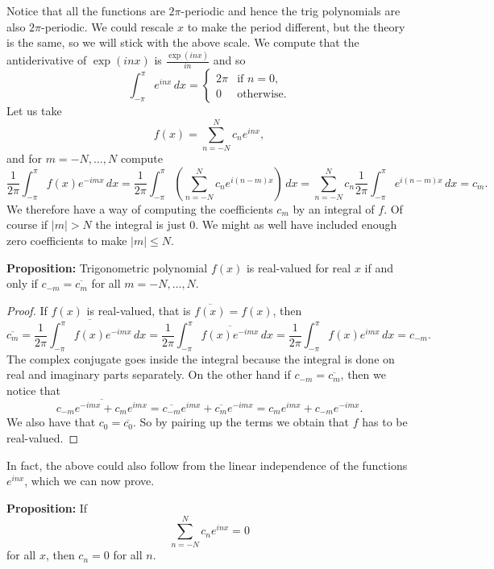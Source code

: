 \documentclass[12pt]{book}
\newcommand{\abs}[1]{\left\lvert {#1} \right\rvert}
\theoremstyle{plain}
\theoremstyle{remark}
\theoremstyle{definition}
\theoremstyle{exercise}
\theoremstyle{example}
\begin{document}
Notice that all the functions are $2\pi$-periodic and hence the trig
polynomials are also $2\pi$-periodic.
We could rescale $x$ to make the period different, but the theory is the
same, so we will stick with the above scale.
We compute that the antiderivative of $\exp(inx)$ is $\frac{\exp(inx)}{in}$ and
so
$$
\int_{-\pi}^\pi e^{inx}\,dx =
\begin{cases}
2\pi & \text{if $n=0$,} \\
0 & \text{otherwise.}
\end{cases}
$$
Let us take
$$
f(x) = \sum_{n=-N}^N c_n e^{inx} ,
$$
and for $m=-N,\ldots,N$ compute
$$
\frac{1}{2\pi} \int_{-\pi}^\pi
f(x) e^{-imx} \, dx
=
\frac{1}{2\pi} \int_{-\pi}^\pi
\left(\sum_{n=-N}^N c_n e^{i(n-m)x}\right)\,dx
=
\sum_{n=-N}^N
c_n
\frac{1}{2\pi}
\int_{-\pi}^\pi
e^{i(n-m)x}
\,dx
=
c_m .
$$
We therefore have a way of computing the coefficients $c_m$ by an integral
of $f$.  Of course if $\abs{m} > N$ the integral is just 0.  We might as
well have included enough zero coefficients to make $\abs{m} \leq N$.

\medskip

\textbf{Proposition:}
Trigonometric polynomial $f(x)$ is real-valued for real $x$ if
and only if $c_{-m} = \overline{c_m}$ for all $m=-N,\ldots,N$.

\medskip

\begin{proof}
If $f(x)$ is real-valued, that is $\overline{f(x)} = f(x)$, then
$$
\overline{c_m}
=
\overline{
\frac{1}{2\pi} \int_{-\pi}^\pi
f(x) e^{-imx} \, dx
}
=
\frac{1}{2\pi} \int_{-\pi}^\pi
\overline{
f(x) e^{-imx} } \, dx
=
\frac{1}{2\pi} \int_{-\pi}^\pi
f(x) e^{imx} \, dx
= c_{-m} .
$$
The complex conjugate goes inside the integral because the integral is
done on real and imaginary parts separately.  On the other hand if 
$c_{-m} = \overline{c_m}$, then we notice that
$$
\overline{c_{-m} e^{-imx}+ c_{m} e^{imx}}
=
\overline{c_{-m}} e^{imx}+ \overline{c_{m}} e^{-imx}
=
c_{m} e^{imx}+ c_{-m} e^{-imx} .
$$
We also have that $c_0 = \overline{c_0}$.
So by pairing up the terms we obtain that $f$ has to be real-valued.
\end{proof}

\medskip

In fact, the above could also follow from the linear independence of the
functions $e^{inx}$, which we can now prove.

\medskip

\textbf{Proposition:}
If
$$
\sum_{n=-N}^N c_n e^{inx} = 0
$$
for all $x$, then $c_n = 0$ for all $n$.
\end{document}
